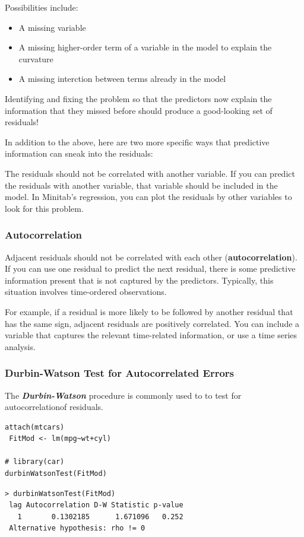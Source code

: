 \documentclass[12pt, a4paper]{article}
\theoremstyle{plain}
\theoremstyle{definition}
\theoremstyle{remark}
\begin{document}
Possibilities include:

\begin{itemize}
\item A missing variable
\item A missing higher-order term of a variable in the model to explain the curvature
\item A missing interction between terms already in the model
\end{itemize}


Identifying and fixing the problem so that the predictors now explain the information that they missed before should produce a good-looking set of residuals!

In addition to the above, here are two more specific ways that predictive information can sneak into the residuals:

The residuals should not be correlated with another variable. If you can predict the residuals with another variable, that variable should be included in the model. In Minitab’s regression, you can plot the residuals by other variables to look for this problem.


\subsubsection{Autocorrelation} 
Adjacent residuals should not be correlated with each other (\textbf{autocorrelation}). If you can use one residual to predict the next residual, there is some predictive information present that is not captured by the predictors. Typically, this situation involves time-ordered observations. 

For example, if a residual is more likely to be followed by another residual that has the same sign, adjacent residuals are positively correlated. You can include a variable that captures the relevant time-related information, or use a time series analysis. 

\subsubsection{Durbin-Watson Test for Autocorrelated Errors}
The \textbf{\textit{Durbin-Watson} }procedure is commonly used to to test for autocorrelationof residuals.

\begin{framed}
\begin{verbatim}
attach(mtcars)
 FitMod <- lm(mpg~wt+cyl)

# library(car)
durbinWatsonTest(FitMod)

\end{verbatim}
\end{framed}
\begin{verbatim}
> durbinWatsonTest(FitMod)
 lag Autocorrelation D-W Statistic p-value
   1       0.1302185      1.671096   0.252
 Alternative hypothesis: rho != 0
\end{verbatim}
\newpage
\end{document}
